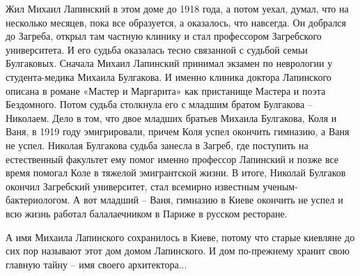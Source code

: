 Жил Михаил Лапинский в этом доме до 1918 года, а потом уехал, думал, что на
несколько месяцев, пока все образуется, а оказалось, что навсегда. Он добрался
до Загреба, открыл там частную клинику и стал профессором Загребского
университета. И его судьба оказалась тесно связанной  с судьбой семьи
Булгаковых. Сначала Михаил Лапинский принимал экзамен по неврологии у
студента-медика Михаила Булгакова. И именно клиника доктора Лапинского описана
в романе «Мастер и Маргарита» как пристанище Мастера и поэта Бездомного. Потом
судьба столкнула его с младшим братом Булгакова – Николаем. Дело в том, что
двое младших братьев Михаила Булгакова, Коля и Ваня, в 1919 году эмигрировали,
причем Коля успел окончить гимназию,  а Ваня не успел. Николая Булгакова судьба
занесла в Загреб, где поступить на естественный факультет ему помог именно
профессор Лапинский и позже  все время помогал Коле в тяжелой эмигрантской
жизни. В итоге, Николай Булгаков окончил Загребский университет, стал всемирно
известным ученым- бактериологом.  А вот младший – Ваня, гимназию в Киеве
окончить не успел и всю жизнь работал балалаечником в Париже в русском
ресторане. 

А имя Михаила Лапинского сохранилось в Киеве, потому что старые киевляне до сих
пор называют этот дом домом Лапинского. И дом по-прежнему хранит свою главную
тайну – имя своего архитектора...

